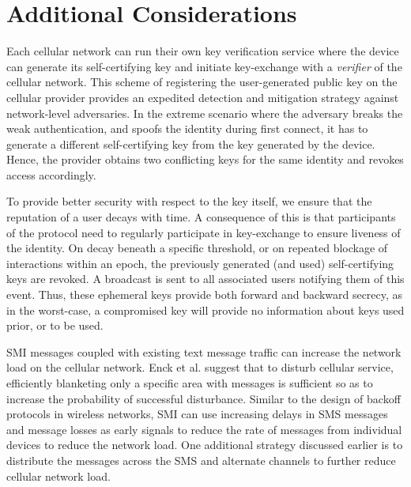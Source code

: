 \documentclass[letterpaper,twocolumn]{sig-alternate}
\begin{document}
 \section{Additional Considerations}
\label{extensions}

 Each cellular network can run their own key verification service where the device can generate its self-certifying key and initiate key-exchange with a {\em verifier} of the cellular network. This scheme of registering the user-generated public key on the cellular provider provides an expedited detection and mitigation strategy against network-level adversaries. In the extreme scenario where the adversary breaks the weak authentication, and spoofs the identity during first connect, it has to generate a different self-certifying key from the key generated by the device. Hence, the provider obtains two conflicting keys for the same identity and revokes access accordingly. 

\vspace{1mm}
 To provide better security with respect to the key itself, we ensure that the reputation of a user decays with time. A consequence of this is that participants of the protocol need to regularly participate in key-exchange to ensure liveness of the identity. On decay beneath a specific threshold, or on repeated blockage of interactions within an epoch, the previously generated (and used) self-certifying keys are revoked. A broadcast is sent to all associated users notifying them of this event. Thus, these ephemeral keys provide both forward and backward secrecy, as in the worst-case, a compromised key will provide no information about keys used prior, or to be used. 

\vspace{1mm}
 SMI messages coupled with existing text message traffic can increase the network load on the cellular network. Enck et al. \cite{enck2005exploiting} suggest that to disturb cellular service, efficiently blanketing only a specific area with messages is sufficient so as to increase the probability of successful disturbance. Similar to the design of backoff protocols in wireless networks, SMI can use increasing delays in SMS messages and message losses as early signals to reduce the rate of messages from individual devices to reduce the network load. One additional strategy discussed earlier is to distribute the messages across the SMS and alternate channels to further reduce cellular network load.
\end{document}
